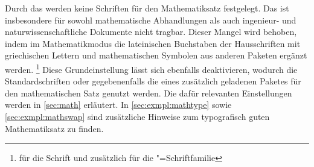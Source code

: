 Durch das \CD werden keine Schriften für den Mathematiksatz festgelegt. Das ist 
insbesondere für sowohl mathematische Abhandlungen als auch ingenieur- und 
naturwissenschaftliche Dokumente nicht tragbar. Dieser Mangel wird behoben, 
indem im Mathematikmodus die lateinischen Buchstaben der Hausschriften mit 
griechischen Lettern und mathematischen Symbolen aus anderen Paketen ergänzt 
werden.%
\footnote{%
   für die Schrift \DIN und zusätzlich  für 
  die \Univers"=Schriftfamilie%
}
Diese Grundeinstellung lässt sich ebenfalls deaktivieren, wodurch die 
Standardschriften oder gegebenenfalls die eines zusätzlich geladenen Paketes 
für den mathematischen Satz genutzt werden. Die dafür relevanten Einstellungen 
werden in \autoref{sec:math} erläutert. In \autoref{sec:exmpl:mathtype} sowie 
\autoref{sec:exmpl:mathswap} sind zusätzliche Hinweise zum typografisch guten 
Mathematiksatz zu finden.


